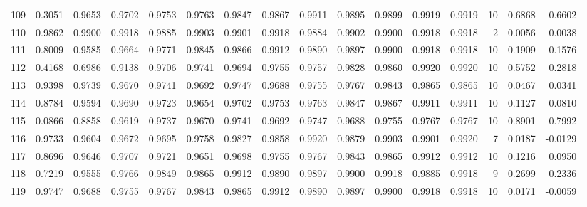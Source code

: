 \begin{tabular}{lrrrrrrrrrrrrrrr}
109 &      0.3051 &  0.9653 &  0.9702 &  0.9753 &  0.9763 &  0.9847 &  0.9867 &  0.9911 &  0.9895 &  0.9899 &   0.9919 &     0.9919 &     10 &                    0.6868 &                     0.6602 \\
110 &      0.9862 &  0.9900 &  0.9918 &  0.9885 &  0.9903 &  0.9901 &  0.9918 &  0.9884 &  0.9902 &  0.9900 &   0.9918 &     0.9918 &      2 &                    0.0056 &                     0.0038 \\
111 &      0.8009 &  0.9585 &  0.9664 &  0.9771 &  0.9845 &  0.9866 &  0.9912 &  0.9890 &  0.9897 &  0.9900 &   0.9918 &     0.9918 &     10 &                    0.1909 &                     0.1576 \\
112 &      0.4168 &  0.6986 &  0.9138 &  0.9706 &  0.9741 &  0.9694 &  0.9755 &  0.9757 &  0.9828 &  0.9860 &   0.9920 &     0.9920 &     10 &                    0.5752 &                     0.2818 \\
113 &      0.9398 &  0.9739 &  0.9670 &  0.9741 &  0.9692 &  0.9747 &  0.9688 &  0.9755 &  0.9767 &  0.9843 &   0.9865 &     0.9865 &     10 &                    0.0467 &                     0.0341 \\
114 &      0.8784 &  0.9594 &  0.9690 &  0.9723 &  0.9654 &  0.9702 &  0.9753 &  0.9763 &  0.9847 &  0.9867 &   0.9911 &     0.9911 &     10 &                    0.1127 &                     0.0810 \\
115 &      0.0866 &  0.8858 &  0.9619 &  0.9737 &  0.9670 &  0.9741 &  0.9692 &  0.9747 &  0.9688 &  0.9755 &   0.9767 &     0.9767 &     10 &                    0.8901 &                     0.7992 \\
116 &      0.9733 &  0.9604 &  0.9672 &  0.9695 &  0.9758 &  0.9827 &  0.9858 &  0.9920 &  0.9879 &  0.9903 &   0.9901 &     0.9920 &      7 &                    0.0187 &                    -0.0129 \\
117 &      0.8696 &  0.9646 &  0.9707 &  0.9721 &  0.9651 &  0.9698 &  0.9755 &  0.9767 &  0.9843 &  0.9865 &   0.9912 &     0.9912 &     10 &                    0.1216 &                     0.0950 \\
118 &      0.7219 &  0.9555 &  0.9766 &  0.9849 &  0.9865 &  0.9912 &  0.9890 &  0.9897 &  0.9900 &  0.9918 &   0.9885 &     0.9918 &      9 &                    0.2699 &                     0.2336 \\
119 &      0.9747 &  0.9688 &  0.9755 &  0.9767 &  0.9843 &  0.9865 &  0.9912 &  0.9890 &  0.9897 &  0.9900 &   0.9918 &     0.9918 &     10 &                    0.0171 &                    -0.0059 \\

\end{tabular}
